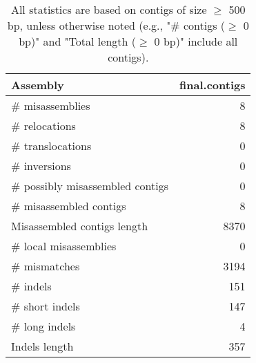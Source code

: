 \documentclass[12pt,a4paper]{article}
\begin{document}
\begin{table}[ht]
\begin{center}
\caption{All statistics are based on contigs of size $\geq$ 500 bp, unless otherwise noted (e.g., "\# contigs ($\geq$ 0 bp)" and "Total length ($\geq$ 0 bp)" include all contigs).}
\begin{tabular}{|l*{1}{|r}|}
\hline
Assembly & final.contigs \\ \hline
\# misassemblies & 8 \\ \hline
\hspace{5mm}\# relocations & 8 \\ \hline
\hspace{5mm}\# translocations & 0 \\ \hline
\hspace{5mm}\# inversions & 0 \\ \hline
\# possibly misassembled contigs & 0 \\ \hline
\# misassembled contigs & 8 \\ \hline
Misassembled contigs length & 8370 \\ \hline
\# local misassemblies & 0 \\ \hline
\# mismatches & 3194 \\ \hline
\# indels & 151 \\ \hline
\hspace{5mm}\# short indels & 147 \\ \hline
\hspace{5mm}\# long indels & 4 \\ \hline
Indels length & 357 \\ \hline
\end{tabular}
\end{center}
\end{table}
\end{document}

